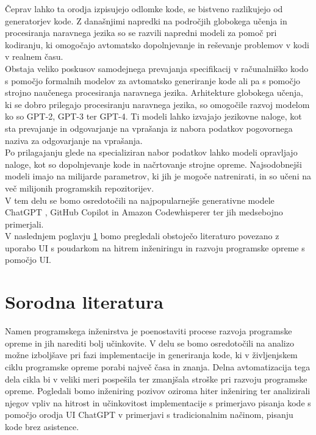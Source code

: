 \documentclass[a4paper,12pt,openright]{book}
\begin{document}
Čeprav lahko ta orodja izpisujejo odlomke kode, se bistveno razlikujejo od generatorjev kode.
Z današnjimi napredki na področjih globokega učenja in procesiranja naravnega jezika so se razvili napredni modeli za pomoč pri kodiranju, ki omogočajo avtomatsko dopolnjevanje in reševanje problemov v kodi v realnem času. \\
Obstaja veliko poskusov samodejnega prevajanja specifikacij v računalniško kodo s pomočjo formalnih modelov za avtomatsko generiranje kode ali pa s pomočjo strojno naučenega procesiranja naravnega jezika. Arhitekture globokega učenja, ki se dobro prilegajo procesiranju naravnega jezika, so omogočile razvoj modelom ko so GPT-2, GPT-3 ter GPT-4. Ti modeli lahko izvajajo jezikovne naloge, kot sta prevajanje in odgovarjanje na vprašanja iz nabora podatkov pogovornega naziva za odgovarjanje na vprašanja. \cite{hu2019re} \\
Po prilagajanju glede na specializiran nabor podatkov lahko modeli opravljajo naloge, kot so dopolnjevanje kode in načrtovanje strojne opreme.  Najsodobnejši modeli imajo na milijarde parametrov, ki jih je mogoče natrenirati, in so učeni na več milijonih programskih repozitorijev.  \cite{hu2019re} \\
V tem delu se bomo osredotočili na najpopularnejše generativne modele ChatGPT \cite{openai_chatgpt}, GitHub Copilot \cite{github_copilot} in Amazon Codewhisperer \cite{saasworthy_codewhisperer} ter jih medsebojno primerjali. \\
\pagebreak
V naslednjem poglavju \ref{char:lit} bomo pregledali obstoječo literaturo povezano z uporabo UI s poudarkom na hitrem inženiringu in razvoju programske opreme s pomočjo UI. 
\section{Sorodna literatura} \label{char:lit}

Namen programskega inženirstva je poenostaviti procese razvoja programske opreme in jih narediti bolj učinkovite. 
V delu se bomo osredotočili na analizo možne izboljšave pri fazi implementacije in generiranja kode, ki v življenjskem ciklu programske opreme porabi največ časa in znanja. Delna avtomatizacija tega dela cikla bi v veliki meri pospešila ter zmanjšala stroške pri razvoju programske opreme. Pogledali bomo inženiring pozivov oziroma hiter inženiring ter analizirali njegov vpliv na hitrost in učinkovitost implementacije s primerjavo pisanja kode s pomočjo orodja UI ChatGPT v primerjavi s tradicionalnim načinom, pisanju kode brez asistence. 
\end{document}
